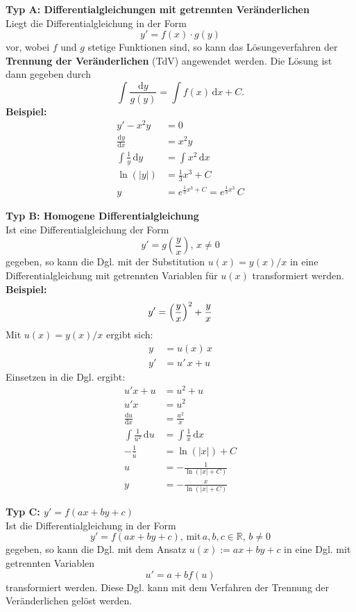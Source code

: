 \noindent
\textbf{Typ A: Differentialgleichungen mit getrennten Ver\"anderlichen}\\
Liegt die Differentialgleichung in der Form
$$
y' =f(x)\cdot g(y)
$$
vor, wobei $f$ und $g$ stetige Funktionen sind, so kann das L\"osungeverfahren der \textbf{Trennung der Ver\"anderlichen} (TdV) angewendet werden. Die L\"osung ist dann gegeben durch
$$
\int \dfrac{\mathrm{d}y}{g(y)} = \int f(x) \, \mathrm{d}x +C.
$$
\textbf{Beispiel:} 
\begin{align*}
y'-x^2y &= 0 \\
\frac{\mathrm{d}y}{\mathrm{d}x} &= x^2y \\
\int \frac{1}{y} \, \mathrm{d}y &= \int x^2 \, \mathrm{d}x \\
\ln(|y|) &= \frac{1}{3} x^3 +C \\
y        &= e^{\frac{1}{3}x^3+C} = e^{\frac{1}{3}x^3} \, C
\end{align*}

\noindent
\textbf{Typ B: Homogene Differentialgleichung}\\
Ist eine Differentialgleichung der Form
$$
y' =g \left( \dfrac{y}{x} \right), \, x \neq 0 
$$
gegeben, so kann die Dgl. mit der Substitution $u(x) = y(x)/x$ in eine Differentialgleichung mit getrennten Variablen f\"ur $u(x)$ transformiert werden.\\
\newpage
\noindent
\textbf{Beispiel:} 
$$
y' = \left( \frac{y}{x} \right)^2 +\frac{y}{x} \\
$$
Mit $u(x) = y(x)/x$ ergibt sich:
\begin{align*}
y &= u(x) \, x \\
y'   &= u' \, x + u 
\end{align*}
Einsetzen in die Dgl. ergibt:
\begin{align*}
u' x + u &= u^2 +u \\
u' x &= u^2 \\
\frac{\mathrm{d}u}{\mathrm{d}x} &= \frac{u^2}{x} \\
\int \frac{1}{u^2}\, \mathrm{d}u &= \int \frac{1}{x} \, \mathrm{d}x \\
-\frac{1}{u} &= \ln(|x|)+C \\
u &= - \frac{1}{\ln(|x| +C)} \\
y &= - \frac{x}{\ln(|x| +C)}
\end{align*}



\noindent
\textbf{Typ C: $y' = f(ax+by+c)$}\\
Ist die Differentialgleichung in der Form 
$$
y' = f(ax+by+c), \, \text{mit} \, a,b,c \in \mathbb{R}, \, b \neq 0
$$
gegeben, so kann die Dgl. mit dem Ansatz $u(x):= ax+by+c$ in eine Dgl. mit getrennten Variablen
$$
u' = a +b f(u)
$$
transformiert werden. Diese Dgl. kann mit dem Verfahren der Trennung der Ver\"anderlichen gel\"ost werden.\\

